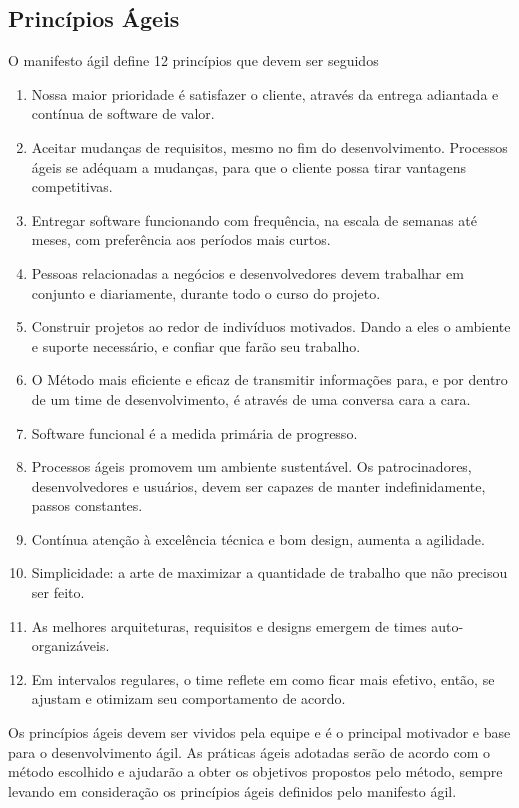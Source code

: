 \subsection{Princípios Ágeis}
\label{principios-ageis}
O manifesto ágil define 12 princípios que devem ser seguidos~\cite{manifesto2001}
%
\begin{enumerate}
\item Nossa maior prioridade é satisfazer o cliente, através da entrega adiantada e contínua de software de valor.
\item Aceitar mudanças de requisitos, mesmo no fim do desenvolvimento. Processos ágeis se adéquam a mudanças, para que o cliente possa tirar vantagens competitivas.
\item Entregar software funcionando com frequência, na escala de semanas até meses, com preferência aos períodos mais curtos.
\item Pessoas relacionadas a negócios e desenvolvedores devem trabalhar em conjunto e diariamente, durante todo o curso do projeto.
\item Construir projetos ao redor de indivíduos motivados. Dando a eles o ambiente e suporte necessário, e confiar que farão seu trabalho.
\item O Método mais eficiente e eficaz de transmitir informações para, e por dentro de um time de desenvolvimento, é através de uma conversa cara a cara.
\item Software funcional é a medida primária de progresso.
\item Processos ágeis promovem um ambiente sustentável. Os patrocinadores, desenvolvedores e usuários, devem ser capazes de manter indefinidamente, passos constantes.
\item Contínua atenção à excelência técnica e bom design, aumenta a agilidade.
\item Simplicidade: a arte de maximizar a quantidade de trabalho que não precisou ser feito.
\item As melhores arquiteturas, requisitos e designs emergem de times auto-organizáveis.
\item Em intervalos regulares, o time reflete em como ficar mais efetivo, então, se ajustam e otimizam seu comportamento de acordo.
\end{enumerate}

Os princípios ágeis devem ser vividos pela equipe e é o principal motivador e base para o desenvolvimento ágil. As práticas ágeis adotadas serão de acordo com o método escolhido e ajudarão a obter os objetivos propostos pelo método, sempre levando em consideração os princípios ágeis definidos pelo manifesto ágil.



